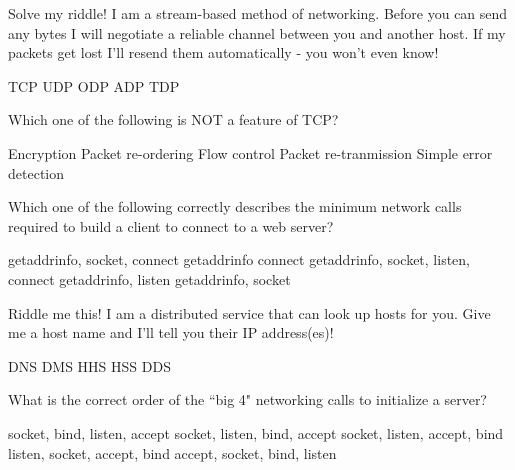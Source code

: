 \variant
Solve my riddle! I am a stream-based method of networking. Before you can send any bytes I will negotiate a reliable channel between you and another host. If my packets get lost I'll resend them automatically - you won't even know!
\begin{answers}
\correctanswer TCP
\answer UDP
\answer ODP
\answer ADP
\answer TDP
\end{answers}
\begin{solution}
\end{solution}

\variant
Which one of the following is NOT a feature of TCP?
\begin{answers}
\correctanswer Encryption
\answer Packet re-ordering
\answer Flow control
\answer Packet re-tranmission
\answer Simple error detection
\end{answers}
\begin{solution}
\end{solution}

\variant
Which one of the following correctly describes the minimum network calls required to build a client to connect to a web server?
\begin{answers}
\correctanswer getaddrinfo, socket, connect
\answer getaddrinfo connect
\answer getaddrinfo, socket, listen, connect
\answer getaddrinfo, listen
\answer getaddrinfo, socket
\end{answers}
\begin{solution}
\end{solution}

\variant
Riddle me this! I am a distributed service that can look up hosts for you. Give me a host name and I'll tell you their IP address(es)!
\begin{answers}
\correctanswer DNS
\answer DMS
\answer HHS
\answer HSS
\answer DDS
\end{answers}
\begin{solution}
\end{solution}


\variant
What is the correct order of the ``big 4" networking calls to initialize a server?
\begin{answers}
\correctanswer socket, bind, listen, accept
\answer socket, listen, bind, accept
\answer socket, listen, accept, bind
\answer listen, socket, accept, bind
\answer accept, socket, bind, listen
\end{answers}
\begin{solution}
\end{solution}


